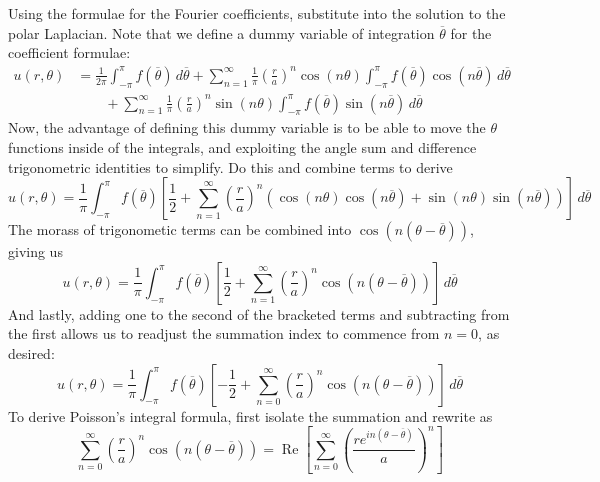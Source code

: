 \documentclass[a4paper]{article}
\begin{document}
Using the formulae for the Fourier coefficients, substitute into the solution to the polar Laplacian. Note that we define a dummy variable of integration \( \overline{\theta} \) for the coefficient formulae:
\begin{align*}
	u \!\left( r,\theta \right) & = \frac{1}{2 \pi}\int^{\pi}_{-\pi} f \!\left( \overline{\theta} \right) \, d \overline{\theta} + \sum^{\infty}_{n=1} \frac{1}{\pi}\!\left( \frac{r}{a} \right)^{n}\cos\!\left(n \theta\right)\int^{\pi}_{-\pi} f \!\left( \overline{\theta} \right)\cos\!\left(n \overline{\theta}\right) \, d \overline{\theta} \\
	 & \qquad + \sum^{\infty}_{n=1} \frac{1}{\pi}\!\left( \frac{r}{a} \right)^{n}\sin\!\left(n \theta\right)\int^{\pi}_{-\pi} f \!\left( \overline{\theta} \right)\sin\!\left(n \overline{\theta}\right) \, d \overline{\theta}
\end{align*}
Now, the advantage of defining this dummy variable is to be able to move the \( \theta \) functions inside of the integrals, and exploiting the angle sum and difference trigonometric identities to simplify. Do this and combine terms to derive
\[
	u \!\left( r,\theta \right) = \frac{1}{\pi}\int^{\pi}_{-\pi} f \!\left( \overline{\theta} \right)\!\left[ \frac{1}{2} + \sum^{\infty}_{n=1} \!\left( \frac{r}{a} \right)^{n}\!\left( \cos\!\left(n \theta\right)\cos\!\left(n \overline{\theta}\right) + \sin\!\left(n \theta\right)\sin\!\left(n \overline{\theta}\right) \right) \right] \, d \overline{\theta}  
\]
The morass of trigonometic terms can be combined into \( \cos\!\left(n \!\left( \theta - \overline{\theta} \right)\right) \), giving us
\[
	u \!\left( r,\theta \right) = \frac{1}{\pi}\int^{\pi}_{-\pi} f \!\left( \overline{\theta} \right)\!\left[ \frac{1}{2} + \sum^{\infty}_{n=1} \!\left( \frac{r}{a} \right)^{n}\cos\!\left(n \!\left( \theta - \overline{\theta} \right)\right) \right] \, d \overline{\theta} 
\]
And lastly, adding one to the second of the bracketed terms and subtracting from the first allows us to readjust the summation index to commence from \( n = 0 \), as desired:
\[
	u \!\left( r,\theta \right) = \frac{1}{\pi}\int^{\pi}_{-\pi} f \!\left( \overline{\theta} \right)\!\left[ -\frac{1}{2} + \sum^{\infty}_{n=0} \!\left( \frac{r}{a} \right)^{n}\cos\!\left(n \!\left( \theta - \overline{\theta} \right)\right) \right] \, d \overline{\theta}  
\]
To derive Poisson's integral formula, first isolate the summation and rewrite as 
\[
	\sum^{\infty}_{n=0} \!\left( \frac{r}{a} \right)^{n}\cos\!\left(n \!\left( \theta - \overline{\theta} \right)\right) = \operatorname{Re}\!\left[ \sum^{\infty}_{n=0} \!\left( \frac{re^{in \!\left( \theta - \overline{\theta} \right)}}{a} \right)^{n} \right]
\]
\end{document}
